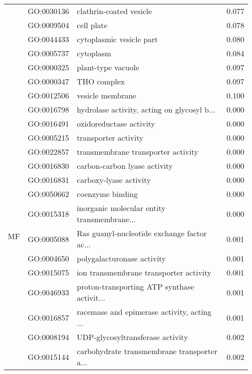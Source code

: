 \begin{longtable}{lllr}
   & GO:0030136 &                      clathrin-coated vesicle &         0.077 \\
   & GO:0009504 &                                   cell plate &         0.078 \\
   & GO:0044433 &                     cytoplasmic vesicle part &         0.080 \\
   & GO:0005737 &                                    cytoplasm &         0.084 \\
   & GO:0000325 &                           plant-type vacuole &         0.097 \\
   & GO:0000347 &                                  THO complex &         0.097 \\
   & GO:0012506 &                             vesicle membrane &         0.100 \\
\cline{1-4}
\multirow{81}{*}{MF} & GO:0016798 &  hydrolase activity, acting on glycosyl b... &         0.000 \\
   & GO:0016491 &                      oxidoreductase activity &         0.000 \\
   & GO:0005215 &                         transporter activity &         0.000 \\
   & GO:0022857 &           transmembrane transporter activity &         0.000 \\
   & GO:0016830 &                 carbon-carbon lyase activity &         0.000 \\
   & GO:0016831 &                       carboxy-lyase activity &         0.000 \\
   & GO:0050662 &                             coenzyme binding &         0.000 \\
   & GO:0015318 &  inorganic molecular entity transmembrane... &         0.000 \\
   & GO:0005088 &  Ras guanyl-nucleotide exchange factor ac... &         0.001 \\
   & GO:0004650 &                   polygalacturonase activity &         0.001 \\
   & GO:0015075 &       ion transmembrane transporter activity &         0.001 \\
   & GO:0046933 &  proton-transporting ATP synthase activit... &         0.001 \\
   & GO:0016857 &  racemase and epimerase activity, acting ... &         0.001 \\
   & GO:0008194 &             UDP-glycosyltransferase activity &         0.002 \\
   & GO:0015144 &  carbohydrate transmembrane transporter a... &         0.002 \\

\end{longtable}

